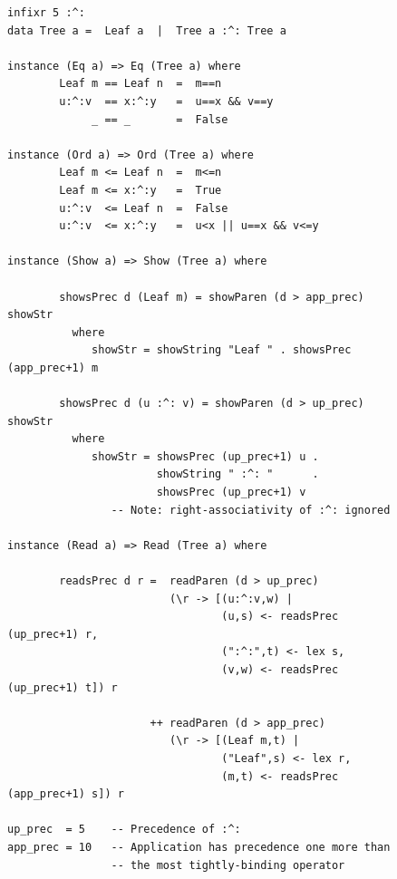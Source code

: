 \begin{figure}[tb]
\begin{outlineenv}
\small
{\small\begin{verbatim}
infixr 5 :^:
data Tree a =  Leaf a  |  Tree a :^: Tree a

instance (Eq a) => Eq (Tree a) where
        Leaf m == Leaf n  =  m==n
        u:^:v  == x:^:y   =  u==x && v==y
             _ == _       =  False

instance (Ord a) => Ord (Tree a) where
        Leaf m <= Leaf n  =  m<=n
        Leaf m <= x:^:y   =  True
        u:^:v  <= Leaf n  =  False
        u:^:v  <= x:^:y   =  u<x || u==x && v<=y

instance (Show a) => Show (Tree a) where

        showsPrec d (Leaf m) = showParen (d > app_prec) showStr
          where
             showStr = showString "Leaf " . showsPrec (app_prec+1) m

        showsPrec d (u :^: v) = showParen (d > up_prec) showStr
          where
             showStr = showsPrec (up_prec+1) u . 
                       showString " :^: "      .
                       showsPrec (up_prec+1) v
                -- Note: right-associativity of :^: ignored

instance (Read a) => Read (Tree a) where

        readsPrec d r =  readParen (d > up_prec)
                         (\r -> [(u:^:v,w) |
                                 (u,s) <- readsPrec (up_prec+1) r,
                                 (":^:",t) <- lex s,
                                 (v,w) <- readsPrec (up_prec+1) t]) r

                      ++ readParen (d > app_prec)
                         (\r -> [(Leaf m,t) |
                                 ("Leaf",s) <- lex r,
                                 (m,t) <- readsPrec (app_prec+1) s]) r

up_prec  = 5    -- Precedence of :^:
app_prec = 10   -- Application has precedence one more than
                -- the most tightly-binding operator
\end{verbatim}}
\end{outlineenv}
\label{tree-inst}
\end{figure}

